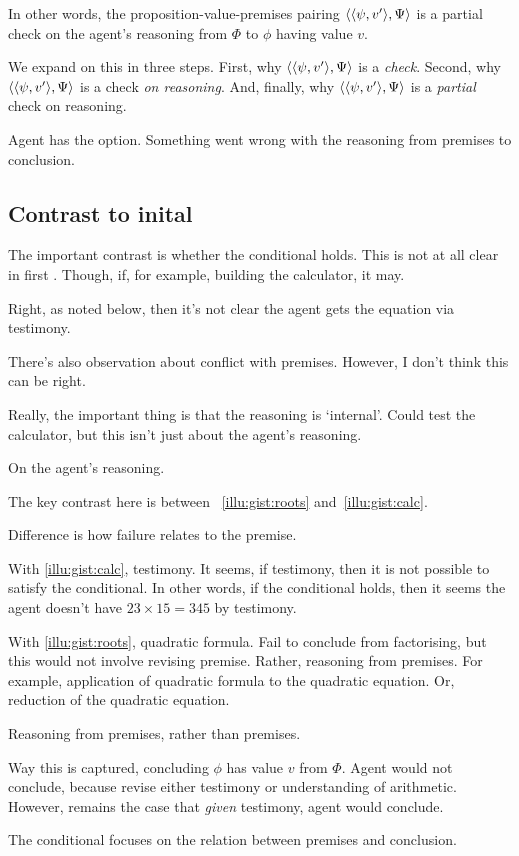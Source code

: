\begin{note}
  In other words, the proposition-value-premises pairing \(\langle \langle \psi, v' \rangle, \Psi \rangle\) is a partial check on the agent's reasoning from \(\Phi\) to \(\phi\) having value \(v\).

  We expand on this in three steps.
  First, why \(\langle \langle \psi, v' \rangle, \Psi \rangle\) is a \emph{check}.
  Second, why \(\langle \langle \psi, v' \rangle, \Psi \rangle\) is a check \emph{on reasoning}.
  And, finally, why \(\langle \langle \psi, v' \rangle, \Psi \rangle\) is a \emph{partial} check on reasoning.
\end{note}

\begin{note}[Check]
  Agent has the option.
  Something went wrong with the reasoning from premises to conclusion.
\end{note}

\subsection{Contrast to inital }

\begin{note}
  \color{blue}
  The important contrast is whether the conditional holds.
  This is not at all clear in first \scen{}.
  Though, if, for example, building the calculator, it may.

  Right, as noted below, then it's not clear the agent gets the equation via testimony.

  There's also observation about conflict with premises.
  However, I don't think this can be right.

  Really, the important thing is that the reasoning is `internal'.
  Could test the calculator, but this isn't just about the agent's reasoning.
\end{note}

\begin{note}
  On the agent's reasoning.

  The key contrast here is between ~\ref{illu:gist:roots} and~\ref{illu:gist:calc}.

  Difference is how failure relates to the premise.

  With \autoref{illu:gist:calc}, testimony.
  It seems, if testimony, then it is not possible to satisfy the conditional.
  In other words, if the conditional holds, then it seems the agent doesn't have \(23 \times 15 = 345\) by testimony.

  With \autoref{illu:gist:roots}, quadratic formula.
  Fail to conclude from factorising, but this would not involve revising premise.
  Rather, reasoning from premises.
  For example, application of quadratic formula to the quadratic equation.
  Or, reduction of the quadratic equation.

  Reasoning from premises, rather than premises.

  Way this is captured, concluding \(\phi\) has value \(v\) from \(\Phi\).
  Agent would not conclude, because revise either testimony or understanding of arithmetic.
  However, remains the case that \emph{given} testimony, agent would conclude.

  The conditional focuses on the relation between premises and conclusion.
\end{note}

